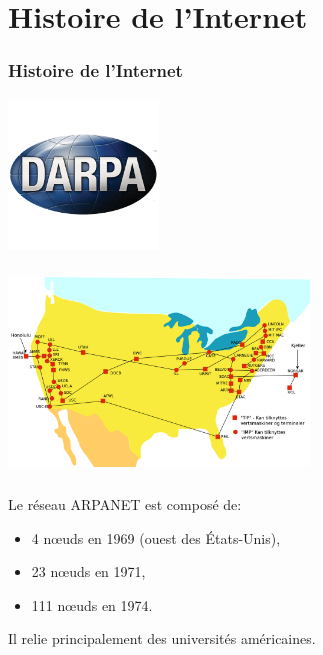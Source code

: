 \documentclass[svgnames,11pt]{beamer}
\begin{document}
\section{Histoire de l'Internet}
\begin{frame}
    \frametitle{Histoire de l'Internet}

    \begin{center}
        \centering
        \includegraphics[width=4cm]{ressources/darpa.png}
        \label{IMG}
        \end{center}

\end{frame}
\begin{frame}
    \frametitle{}

    \begin{center}
        \centering
        \includegraphics[width=8cm]{ressources/arpanet.png}
        \label{IMG}
        \end{center}

\end{frame}
\begin{frame}
    \frametitle{}

    \begin{aretenir}[]
        Le réseau ARPANET est composé de:
        \begin{itemize}
            \item 4 nœuds en 1969 (ouest des États-Unis),
            \item 23 nœuds en 1971, 
            \item 111 nœuds en 1974.
        \end{itemize}
        Il relie principalement des universités américaines.
        \end{aretenir}

\end{frame}
\end{document}

